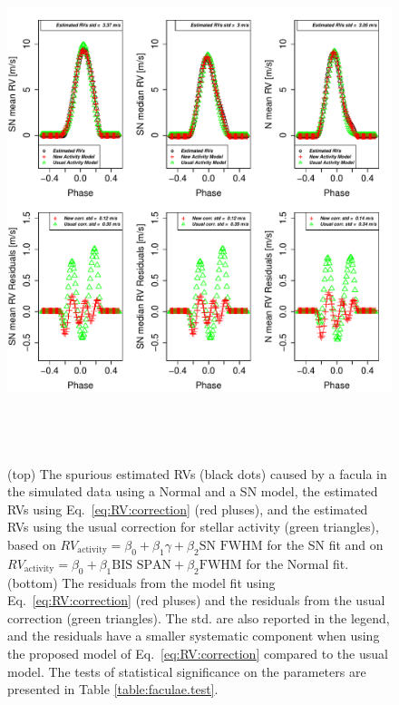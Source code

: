 \documentclass{aa}
\begin{document}
\begin{figure}[htbp]
\begin{center}
\includegraphics[height = 6in]{FACULAE_NEW_CORRECTION_[3]CorrectionActivity_RadialVelocity_vs_time.pdf} 
   \caption{(top) The spurious estimated RVs (black dots) caused by a facula in the simulated data using a Normal and a SN model, the estimated RVs using Eq.~\eqref{eq:RV:correction} (red pluses), and the estimated RVs using the usual correction for stellar activity (green triangles), based on $RV_{\text{activity}}=\beta_0+\beta_1 \gamma + \beta_2 \text{SN FWHM}$ for the SN fit and on $RV_{\text{activity}}=\beta_0+\beta_1 \text{BIS SPAN} + \beta_2 \text{FWHM}$ for the Normal fit.    
 (bottom) The residuals from the model fit using Eq.~\eqref{eq:RV:correction} (red pluses) and the residuals from the usual correction (green triangles). The std. are also reported in the legend, and the residuals have a smaller systematic component when using the proposed model of Eq.~\eqref{eq:RV:correction} compared to the usual model.
The tests of statistical significance on the parameters are presented in Table \ref{table:faculae.test}.
}\label{fig:faculae.correction}
\end{center}
\end{figure}
\end{document}
